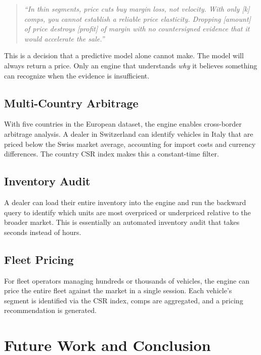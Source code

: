 \documentclass[11pt,a4paper,twoside]{book}
\begin{document}
\begin{quote}
    \textit{``In thin segments, price cuts buy margin loss, not velocity. With only [k] comps,
    you cannot establish a reliable price elasticity. Dropping [amount] of price destroys
    [profit] of margin with no countersigned evidence that it would accelerate the sale.''}
\end{quote}

This is a decision that a predictive model alone cannot make. The model will always return
a price. Only an engine that understands \textit{why} it believes something can recognize when
the evidence is insufficient.

\section{Multi-Country Arbitrage}

With five countries in the European dataset, the engine enables cross-border arbitrage
analysis. A dealer in Switzerland can identify vehicles in Italy that are priced below the
Swiss market average, accounting for import costs and currency differences. The country
CSR index makes this a constant-time filter.

\section{Inventory Audit}

A dealer can load their entire inventory into the engine and run the backward query to
identify which units are most overpriced or underpriced relative to the broader market.
This is essentially an automated inventory audit that takes seconds instead of hours.

\section{Fleet Pricing}

For fleet operators managing hundreds or thousands of vehicles, the engine can price the
entire fleet against the market in a single session. Each vehicle's segment is identified
via the CSR index, comps are aggregated, and a pricing recommendation is generated.

\chapter{Future Work and Conclusion}
\end{document}
